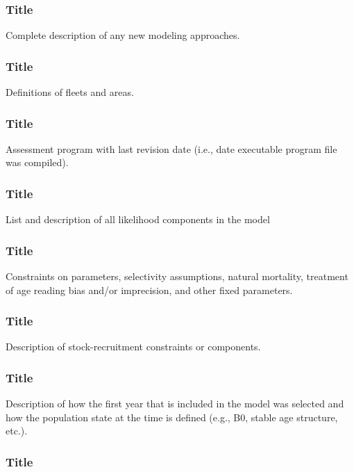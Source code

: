 \documentclass[12pt,]{article}
\begin{document}
\subsubsection{Title}\label{title-7}

Complete description of any new modeling approaches.

\subsubsection{Title}\label{title-8}

Definitions of fleets and areas.

\subsubsection{Title}\label{title-9}

Assessment program with last revision date (i.e., date executable
program file was compiled).

\subsubsection{Title}\label{title-10}

List and description of all likelihood components in the model

\subsubsection{Title}\label{title-11}

Constraints on parameters, selectivity assumptions, natural mortality,
treatment of age reading bias and/or imprecision, and other fixed
parameters.

\subsubsection{Title}\label{title-12}

Description of stock-recruitment constraints or components.

\subsubsection{Title}\label{title-13}

Description of how the first year that is included in the model was
selected and how the population state at the time is defined (e.g., B0,
stable age structure, etc.).

\subsubsection{Title}\label{title-14}
\end{document}
